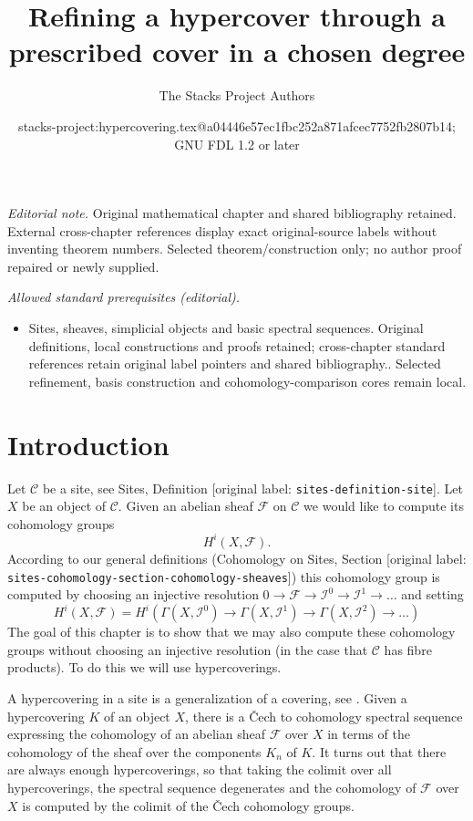 \documentclass[10pt,a4paper]{article}
\title{Refining a hypercover through a prescribed cover in a chosen degree}
\author{The Stacks Project Authors}
\date{stacks-project:hypercovering.tex@a04446e57ec1fbc252a871afcec7752fb2807b14; GNU FDL 1.2 or later}
\theoremstyle{plain}
\theoremstyle{definition}
\theoremstyle{remark}
\numberwithin{equation}{subsection}
\begin{document}
\maketitle
\noindent\textit{Editorial note.} Original mathematical chapter and shared bibliography retained. External cross-chapter references display exact original-source labels without inventing theorem numbers. Selected theorem/construction only; no author proof repaired or newly supplied.\par\medskip
\noindent\textit{Allowed standard prerequisites (editorial).}\begin{itemize}
\item Sites, sheaves, simplicial objects and basic spectral sequences. Original definitions, local constructions and proofs retained; cross-chapter standard references retain original label pointers and shared bibliography.. Selected refinement, basis construction and cohomology-comparison cores remain local.
\end{itemize}\medskip
\section{Introduction}
\label{section-introduction}

\noindent
Let $\mathcal{C}$ be a site, see Sites, Definition \textnormal{[original label: \nolinkurl{sites-definition-site}]}.
Let $X$ be an object of $\mathcal{C}$.
Given an abelian sheaf $\mathcal{F}$
on $\mathcal{C}$ we would like to compute
its cohomology groups
$$
H^i(X, \mathcal{F}).
$$
According to our general definitions (Cohomology on Sites, Section
\textnormal{[original label: \nolinkurl{sites-cohomology-section-cohomology-sheaves}]})
this cohomology group is computed by
choosing an injective resolution
$
0 \to \mathcal{F} \to \mathcal{I}^0 \to \mathcal{I}^1 \to \ldots
$
and setting
$$
H^i(X, \mathcal{F})
=
H^i(
\Gamma(X, \mathcal{I}^0) \to
\Gamma(X, \mathcal{I}^1) \to
\Gamma(X, \mathcal{I}^2)\to \ldots)
$$
The goal of this chapter is to show that we may also compute these
cohomology groups without choosing an injective resolution
(in the case that $\mathcal{C}$ has fibre products). To do this
we will use hypercoverings.

\medskip\noindent
A hypercovering in a site is a generalization of a covering, see
\cite[Expos\'e V, Sec. 7]{SGA4}. Given a hypercovering $K$ of an object
$X$, there is a {\v C}ech to cohomology spectral sequence
expressing the cohomology of an abelian sheaf $\mathcal{F}$
over $X$ in terms of the cohomology of the sheaf over the
components $K_n$ of $K$. It turns out that there are always
enough hypercoverings, so that taking the colimit over all hypercoverings,
the spectral sequence degenerates and the cohomology of $\mathcal{F}$
over $X$ is computed by the colimit of the {\v C}ech cohomology groups.
\end{document}
